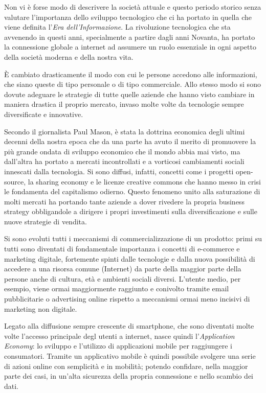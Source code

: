 Non vi è forse modo di descrivere la società attuale e questo periodo storico senza valutare l'importanza dello sviluppo tecnologico che ci ha portato in quella che viene definita l'\textit{Era dell'Informazione}.
La rivoluzione tecnologica che sta avvenendo in questi anni, specialmente a partire dagli anni Novanta, ha portato la connessione globale a internet ad assumere un ruolo essenziale in ogni aspetto della società moderna e della nostra vita.

È cambiato drasticamente il modo con cui le persone accedono alle informazioni, che siano queste di tipo personale o di tipo commerciale.
Allo stesso modo si sono dovute adeguare le strategie di tutte quelle aziende che hanno visto cambiare in maniera drastica il proprio mercato, invaso molte volte da tecnologie sempre diversificate e innovative.

Secondo il giornalista Paul Mason, è stata la dottrina economica degli ultimi decenni della nostra epoca che da una parte ha avuto il merito di promuovere la più grande ondata di sviluppo economico che il mondo abbia mai visto, ma dall’altra ha portato a mercati incontrollati e a vorticosi cambiamenti sociali innescati dalla tecnologia.
Si sono diffusi, infatti, concetti come i progetti open-source, la sharing economy e le licenze creative commons che hanno messo in crisi le fondamenta del capitalismo odierno.
Questo fenomeno unito alla saturazione di molti mercati ha portando tante aziende a dover rivedere la propria business strategy obbligandole a dirigere i propri investimenti sulla diversificazione e sulle nuove strategie di vendita. \autocite{POSTCAPITALISMO}

Si sono evoluti tutti i meccanismi di commercializzazione di un prodotto: primi su tutti sono diventati di fondamentale importanza i concetti di e-commerce e marketing digitale, fortemente spinti dalle tecnologie e dalla nuova possibilità di accedere a una risorsa comune (Internet) da parte della maggior parte della persone anche di cultura, età e ambienti sociali diversi.
L'utente medio, per esempio, viene ormai maggiormente raggiunto e conivolto tramite email pubblicitarie o advertising online rispetto a meccanismi ormai meno incisivi di marketing non digitale.

Legato alla diffusione sempre crescente di smartphone, che sono diventati molte volte l'accesso principale degl utenti a internet, nasce quindi l'\textit{Application Economy}: lo sviluppo e l'utilizzo di applicazioni mobile per raggiungere i consumatori.
Tramite un applicativo mobile è quindi possibile svolgere una serie di azioni online con semplicità e in mobilità; potendo confidare, nella maggior parte dei casi, in un'alta sicurezza della propria connessione e nello scambio dei dati.

